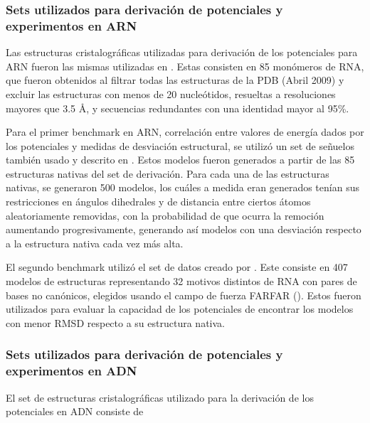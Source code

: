 \subsubsection{Sets utilizados para derivación de potenciales y experimentos en ARN}
\par
Las estructuras cristalográficas utilizadas para derivación de los potenciales para ARN fueron las 
mismas utilizadas en \cite{Capriotti2011}. 
Estas consisten en 85 monómeros de RNA, que fueron obtenidos al filtrar todas las estructuras de 
la PDB (Abril 2009) y excluir las estructuras con menos de 20 nucleótidos, resueltas a 
resoluciones mayores que 3.5 \si{\angstrom}, y secuencias redundantes con una identidad mayor al 
95\%.
\par
Para el primer benchmark en ARN, correlación entre valores de energía dados por los potenciales y 
medidas de desviación estructural, se utilizó un set de señuelos también usado y descrito en 
\cite{Capriotti2011}.
Estos modelos fueron generados a partir de las 85 estructuras nativas del set de derivación. 
Para cada una de las estructuras nativas, se generaron 500 modelos, los cuáles a medida eran 
generados tenían sus restricciones en ángulos dihedrales y de distancia entre ciertos átomos 
aleatoriamente removidas, con la probabilidad de que ocurra la remoción aumentando 
progresivamente, generando así modelos con una desviación respecto a la estructura nativa cada 
vez más alta.
\par
El segundo benchmark utilizó el set de datos creado por \cite{Das2010}. 
Este consiste en 407 modelos de estructuras representando 32 motivos distintos de RNA con 
pares de bases no canónicos, elegidos usando el campo de fuerza FARFAR (\cite{Das2010}). 
Estos fueron utilizados para evaluar la capacidad de los potenciales de encontrar los modelos 
con menor RMSD respecto a su estructura nativa.
\subsubsection{Sets utilizados para derivación de potenciales y experimentos en ADN}
\par
El set de estructuras cristalográficas utilizado para la derivación de los potenciales en ADN
consiste de 

